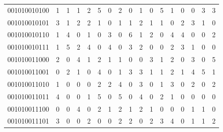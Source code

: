 \documentclass[10pt,a4paper]{article}
\begin{document}
\begin{longtable}{ |c|c|c|c|c|c|c|c|c|c|c|c|c|c|c|c|c| }
    001010010100              & 1                            & 1                                & 1                            & 2                              & 5   & 0   & 2   & 0   & 1   & 0   & 5   & 1   & 0   & 0   & 3   & 3   \\
    001010010101              & 3                            & 1                                & 2                            & 2                              & 1   & 0   & 1   & 1   & 2   & 1   & 1   & 0   & 2   & 3   & 1   & 0   \\
    001010010110              & 1                            & 4                                & 0                            & 1                              & 0   & 3   & 0   & 6   & 1   & 2   & 0   & 4   & 4   & 0   & 0   & 2   \\
    001010010111              & 1                            & 5                                & 2                            & 4                              & 0   & 4   & 0   & 3   & 2   & 0   & 0   & 2   & 3   & 1   & 0   & 0   \\
    001010011000              & 2                            & 0                                & 4                            & 1                              & 2   & 1   & 1   & 0   & 0   & 3   & 1   & 2   & 0   & 3   & 0   & 5   \\
    001010011001              & 0                            & 2                                & 1                            & 0                              & 4   & 0   & 1   & 3   & 3   & 1   & 1   & 2   & 1   & 4   & 5   & 1   \\
    001010011010              & 1                            & 0                                & 0                            & 0                              & 2   & 2   & 4   & 0   & 3   & 0   & 1   & 3   & 0   & 2   & 0   & 2   \\
    001010011011              & 4                            & 0                                & 0                            & 1                              & 5   & 0   & 5   & 0   & 4   & 0   & 2   & 1   & 0   & 0   & 0   & 0   \\
    001010011100              & 0                            & 0                                & 4                            & 0                              & 2   & 1   & 2   & 1   & 2   & 1   & 0   & 0   & 0   & 1   & 1   & 0   \\
    001010011101              & 3                            & 0                                & 0                            & 2                              & 0   & 0   & 2   & 2   & 0   & 2   & 3   & 4   & 0   & 1   & 1   & 2   \\

\end{longtable}
\end{document}
